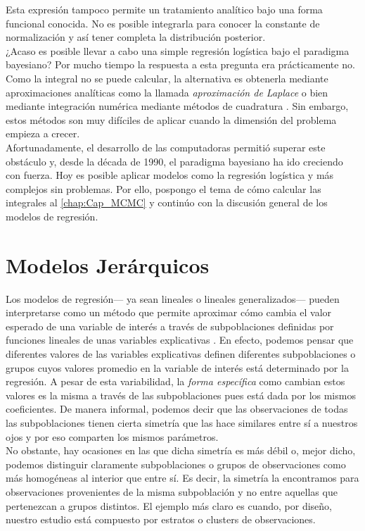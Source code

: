 Esta expresión tampoco permite un tratamiento analítico bajo una forma funcional conocida. No es posible integrarla para conocer la constante de normalización y así tener completa la distribución posterior.\\

¿Acaso es posible llevar a cabo una simple regresión logística bajo el paradigma bayesiano? Por mucho tiempo la respuesta a esta pregunta era prácticamente no. Como la integral no se puede calcular, la alternativa es obtenerla mediante aproximaciones analíticas como la llamada \textit{aproximación de Laplace} o bien mediante integración numérica mediante métodos de cuadratura \parencites{Nieto16,GP97}. Sin embargo, estos métodos son muy difíciles de aplicar cuando la dimensión del problema empieza a crecer.\\ 

Afortunadamente, el desarrollo de las computadoras permitió superar este obstáculo y, desde la década de 1990, el paradigma bayesiano ha ido creciendo con fuerza. Hoy es posible aplicar modelos como la regresión logística y más complejos sin problemas. Por ello, pospongo el tema de cómo calcular las integrales al \autoref{chap:Cap_MCMC} y continúo con la discusión general de los modelos de regresión. 

\section{Modelos Jerárquicos}

Los modelos de regresión--- ya sean lineales o lineales generalizados--- pueden interpretarse como un método que permite aproximar cómo cambia el valor esperado de una variable de interés a través de subpoblaciones definidas por funciones lineales de unas variables explicativas \parencite{GelmanHill06}. En efecto, podemos pensar que diferentes valores de las variables explicativas definen diferentes subpoblaciones o grupos cuyos valores promedio en la variable de interés está determinado por la regresión. A pesar de esta variabilidad, la \textit{forma específica} como cambian estos valores es la misma a través de las subpoblaciones pues está dada por los mismos coeficientes. De manera informal, podemos decir que las observaciones de todas las subpoblaciones tienen cierta simetría que las hace similares entre sí a nuestros ojos y por eso comparten los mismos parámetros.\\ 

No obstante, hay ocasiones en las que dicha simetría es más débil o, mejor dicho, podemos distinguir claramente subpoblaciones o grupos de observaciones como más homogéneas al interior que entre sí. Es decir, la simetría la encontramos para observaciones provenientes de la misma subpoblación y no entre aquellas que pertenezcan a grupos distintos. El ejemplo más claro es cuando, por diseño, nuestro estudio está compuesto por estratos o clusters de observaciones.\\ 

